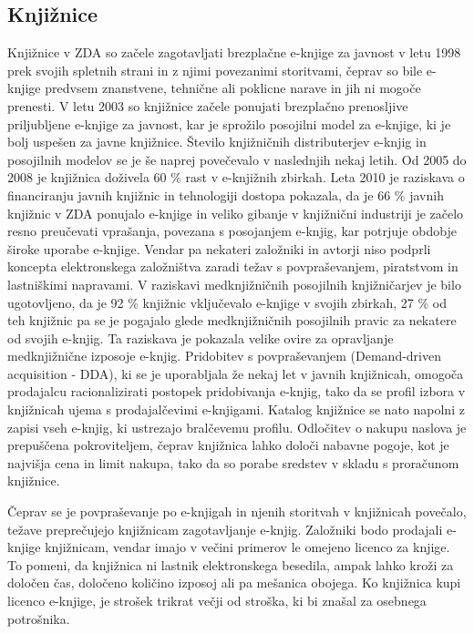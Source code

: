 \documentclass[a4paper, 12pt]{book}
\begin{document}
\subsection{Knjižnice}
\label{eknjiga_knjiznice}
Knjižnice v ZDA so začele zagotavljati brezplačne e-knjige za javnost v letu 1998 prek svojih spletnih strani in z njimi povezanimi storitvami, \cite{13} čeprav so bile e-knjige predvsem znanstvene, tehnične ali poklicne narave in jih ni mogoče prenesti. V letu 2003 so knjižnice začele ponujati brezplačno prenosljive priljubljene e-knjige za javnost, kar je sprožilo posojilni model za e-knjige, ki je bolj uspešen za javne knjižnice. \cite{14} Število knjižničnih distributerjev e-knjig in posojilnih modelov se je še naprej povečevalo v naslednjih nekaj letih. Od 2005 do 2008 je knjižnica doživela 60 \% rast v e-knjižnih zbirkah. \cite{15} Leta 2010 je raziskava o financiranju javnih knjižnic in tehnologiji dostopa \cite{16}  pokazala, da je 66 \% javnih knjižnic v ZDA ponujalo e-knjige \cite{17} in veliko gibanje v knjižnični industriji je začelo resno preučevati vprašanja, povezana s posojanjem e-knjig, kar potrjuje obdobje široke uporabe e-knjige. \cite{18} Vendar pa nekateri založniki in avtorji niso podprli koncepta elektronskega založništva zaradi težav s povpraševanjem, piratstvom in lastniškimi napravami. \cite{19} V raziskavi medknjižničnih posojilnih knjižničarjev je bilo ugotovljeno, da je 92 \% knjižnic vključevalo e-knjige v svojih zbirkah, 27 \% od teh knjižnic pa se je pogajalo glede medknjižničnih posojilnih pravic za nekatere od svojih e-knjig. Ta raziskava je pokazala velike ovire za opravljanje medknjižnične izposoje e-knjig. \cite{20} Pridobitev s povpraševanjem (Demand-driven acquisition - DDA), ki se je uporabljala že nekaj let v javnih knjižnicah, omogoča prodajalcu racionalizirati postopek pridobivanja e-knjig, tako da se profil izbora v knjižnicah ujema s prodajalčevimi e-knjigami. \cite{21} Katalog knjižnice se nato napolni z zapisi vseh e-knjig, ki ustrezajo bralčevemu profilu. \cite{21} Odločitev o nakupu naslova je prepuščena pokroviteljem, čeprav knjižnica lahko določi nabavne pogoje, kot je najvišja cena in limit nakupa, tako da so porabe sredstev v skladu s proračunom knjižnice. \cite{21}

Čeprav se je povpraševanje po e-knjigah in njenih storitvah v knjižnicah povečalo, težave preprečujejo knjižnicam zagotavljanje e-knjig. \cite{22} Založniki bodo prodajali e-knjige knjižnicam, vendar imajo v večini primerov le omejeno licenco za knjige. To pomeni, da knjižnica ni lastnik elektronskega besedila, ampak lahko kroži za določen čas, določeno količino izposoj ali pa mešanica obojega. Ko knjižnica kupi licenco e-knjige, je strošek trikrat večji od stroška, ki bi znašal za osebnega potrošnika. \cite{22}
\end{document}
